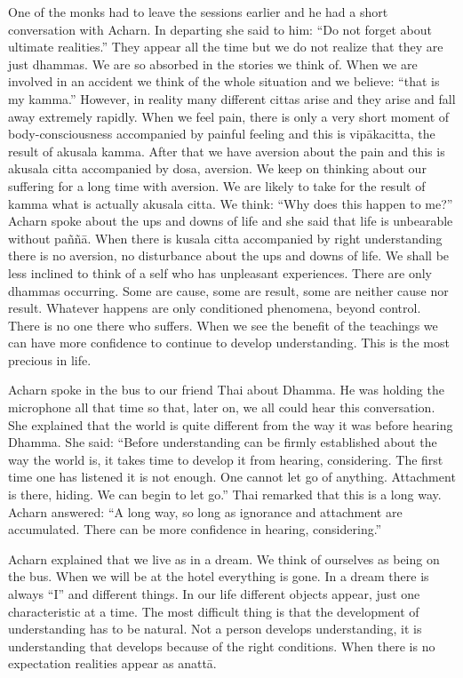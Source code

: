 {{{{{{{One of the monks had to leave the
sessions earlier and he had a short conversation with Acharn. In
departing she said to him: ``Do not forget about ultimate realities.''
They appear all the time but we do not realize that they are just
dhammas. We are so absorbed in the stories we think of. When we are
involved in an accident we think of the whole situation and we believe:
``that is my kamma.'' However, in reality many different cittas arise
and they arise and fall away extremely rapidly. When we feel pain, there
is only a very short moment of body-consciousness accompanied by painful
feeling and this is vipākacitta, the result of akusala kamma. After that
we have aversion about the pain and this is akusala citta accompanied by
dosa, aversion. We keep on thinking about our suffering for a long time
with aversion. We are likely to take for the result of kamma what is
actually akusala citta. We think: ``Why does this happen to me?'' Acharn
spoke about the ups and downs of life and she said that life is
unbearable without paññā. When there is kusala citta accompanied by
right understanding there is no aversion, no disturbance about the ups
and downs of life. We shall be less inclined to think of a self who has
unpleasant experiences.
There are only dhammas occurring. Some
are cause, some are result, some are neither cause nor result. Whatever
happens are only conditioned phenomena, beyond control. There is no one
there who suffers. When we see the benefit of the teachings we can have
more confidence to continue to develop understanding. This is the most
precious in life.

Acharn spoke in the bus to our friend
Thai about Dhamma. He was holding the microphone all that time so that,
later on, we all could hear this conversation. She explained that the
world is quite different from the way it was before hearing Dhamma. She
said: ``Before understanding can be firmly established about the way the
world is, it takes time to develop it from hearing, considering. The
first time one has listened it is not enough. One cannot let go of
anything. Attachment is there, hiding. We can begin to let go.'' Thai
remarked that this is a long way. Acharn answered: ``A long way, so long
as ignorance and attachment are accumulated. There can be more
confidence in hearing, considering.''

Acharn explained that we live as in a
dream. We think of ourselves as being on the bus. When we will be at the
hotel everything is gone. In a dream there is always ``I'' and different
things. In our life different objects appear, just one characteristic at
a time. The most difficult thing is that the development of
understanding has to be natural. Not a person develops understanding, it
is understanding that develops because of the right conditions. When
there is no expectation realities appear as anattā. 

}}}}}}}
